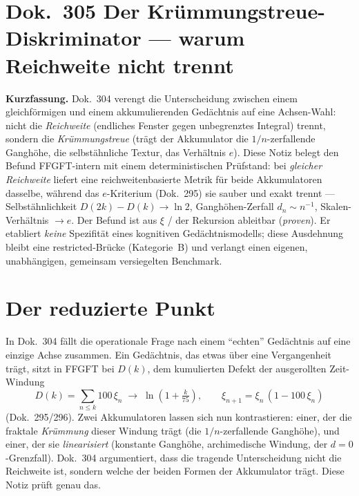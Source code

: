 
\section*{Dok.~305 \quad Der Krümmungstreue-Diskriminator --- warum Reichweite nicht trennt}

\begingroup\small\noindent
\textbf{Kurzfassung.} Dok.~304 verengt die Unterscheidung zwischen einem gleichförmigen und
einem akkumulierenden Gedächtnis auf eine Achsen-Wahl: nicht die \emph{Reichweite} (endliches
Fenster gegen unbegrenztes Integral) trennt, sondern die \emph{Krümmungstreue} (trägt der
Akkumulator die $1/n$-zerfallende Ganghöhe, die selbstähnliche Textur, das Verhältnis $e$).
Diese Notiz belegt den Befund FFGFT-intern mit einem deterministischen Prüfstand: bei
\emph{gleicher Reichweite} liefert eine reichweitenbasierte Metrik für beide Akkumulatoren
dasselbe, während das $e$-Kriterium (Dok.~295) sie sauber und exakt trennt --- Selbstähnlichkeit
$D(2k)-D(k)\to\ln 2$, Ganghöhen-Zerfall $d_n\sim n^{-1}$, Skalen-Verhältnis $\to e$. Der Befund
ist aus $\xi$ / der Rekursion ableitbar (\emph{proven}). Er etabliert \emph{keine} Spezifität
eines kognitiven Gedächtnismodells; diese Ausdehnung bleibt eine restricted-Brücke
(Kategorie~B) und verlangt einen eigenen, unabhängigen, gemeinsam versiegelten Benchmark.
\par\endgroup

\medskip

\section{Der reduzierte Punkt}

In Dok.~304 fällt die operationale Frage nach einem \enquote{echten} Gedächtnis auf eine
einzige Achse zusammen. Ein Gedächtnis, das etwas über eine Vergangenheit trägt, sitzt in
FFGFT bei $D(k)$, dem kumulierten Defekt der ausgerollten Zeit-Windung
\begin{equation}
D(k) = \sum_{n\le k} 100\,\xi_n \;\to\; \ln\!\left(1+\tfrac{k}{75}\right),
\qquad \xi_{n+1}=\xi_n\,(1-100\,\xi_n)
\end{equation}
(Dok.~295/296). Zwei Akkumulatoren lassen sich nun kontrastieren: einer, der die fraktale
\emph{Krümmung} dieser Windung trägt (die $1/n$-zerfallende Ganghöhe), und einer, der sie
\emph{linearisiert} (konstante Ganghöhe, archimedische Windung, der $d=0$-Grenzfall). Dok.~304
argumentiert, dass die tragende Unterscheidung nicht die Reichweite ist, sondern welche der
beiden Formen der Akkumulator trägt. Diese Notiz prüft genau das.

